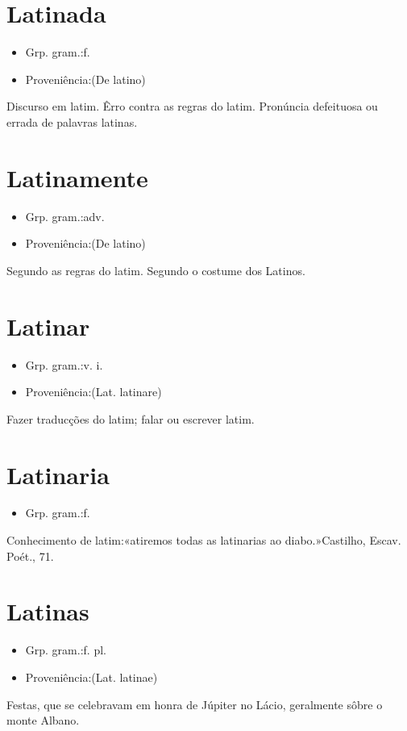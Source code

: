 \section{Latinada}
\begin{itemize}
\item {Grp. gram.:f.}
\end{itemize}
\begin{itemize}
\item {Proveniência:(De \textunderscore latino\textunderscore )}
\end{itemize}
Discurso em latim.
Êrro contra as regras do latim.
Pronúncia defeituosa ou errada de palavras latinas.
\section{Latinamente}
\begin{itemize}
\item {Grp. gram.:adv.}
\end{itemize}
\begin{itemize}
\item {Proveniência:(De \textunderscore latino\textunderscore )}
\end{itemize}
Segundo as regras do latim.
Segundo o costume dos Latinos.
\section{Latinar}
\begin{itemize}
\item {Grp. gram.:v. i.}
\end{itemize}
\begin{itemize}
\item {Proveniência:(Lat. \textunderscore latinare\textunderscore )}
\end{itemize}
Fazer traducções do latim; falar ou escrever latim.
\section{Latinaria}
\begin{itemize}
\item {Grp. gram.:f.}
\end{itemize}
Conhecimento de latim:«\textunderscore atiremos todas as latinarias ao diabo.\textunderscore »Castilho, \textunderscore Escav. Poét.\textunderscore , 71.
\section{Latinas}
\begin{itemize}
\item {Grp. gram.:f. pl.}
\end{itemize}
\begin{itemize}
\item {Proveniência:(Lat. \textunderscore latinae\textunderscore )}
\end{itemize}
Festas, que se celebravam em honra de Júpiter no Lácio, geralmente sôbre o monte Albano.
